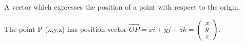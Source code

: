 A vector which expresses the position of a point with respect to
the origin.
\par
The point P (x,y,z) has position vector $ \vec{OP}
= xi+yj+zk = \left ( 
\begin{array}{c} 
  x \\
  y \\
  z 
\end{array} 
\right ) . $